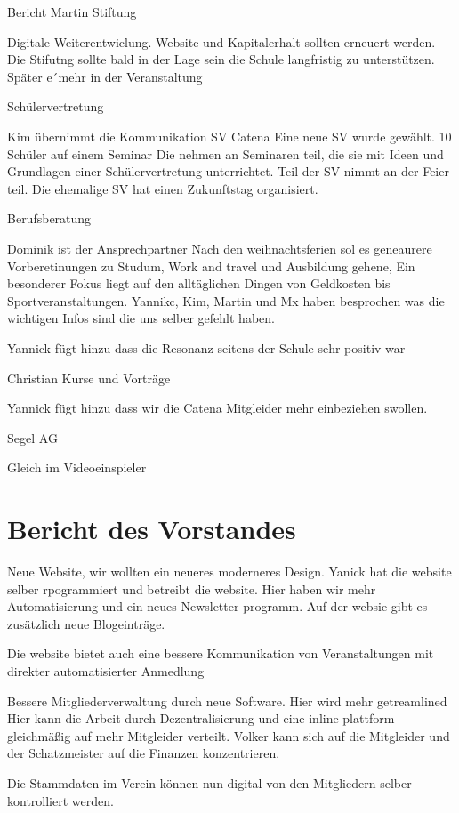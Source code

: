 \documentclass[a4paper, 11pt]{article}
\begin{document}
Bericht Martin Stiftung

Digitale Weiterentwiclung. Website und Kapitalerhalt sollten erneuert werden.
Die Stifutng sollte bald in der Lage sein die Schule langfristig zu unterstützen. 
Später e´mehr in der Veranstaltung

Schülervertretung

Kim übernimmt die Kommunikation SV Catena
Eine neue SV wurde gewählt. 10 Schüler auf einem Seminar
Die nehmen an Seminaren teil, die sie mit Ideen und Grundlagen einer Schülervertretung unterrichtet.
Teil der SV nimmt an der Feier teil.
Die ehemalige SV hat einen Zukunftstag organisiert.

Berufsberatung

Dominik ist der Ansprechpartner
Nach den weihnachtsferien sol es geneaurere Vorberetinungen zu Studum, Work and travel und Ausbildung gehene,
Ein besonderer Fokus liegt auf den alltäglichen Dingen von Geldkosten bis Sportveranstaltungen.
Yannikc, Kim, Martin und Mx haben besprochen was die wichtigen Infos sind die uns selber gefehlt haben.

Yannick fügt hinzu dass die Resonanz seitens der Schule sehr positiv war

Christian Kurse und Vorträge

Yannick fügt hinzu dass wir die Catena Mitgleider mehr einbeziehen swollen.

Segel AG

Gleich im Videoeinspieler


\section*{Bericht des Vorstandes}

Neue Website, wir wollten ein neueres moderneres Design.
Yanick hat die website selber rpogrammiert und betreibt die website.
Hier haben wir mehr Automatisierung und ein neues Newsletter programm.
Auf der websie gibt es zusätzlich neue Blogeinträge.

Die website bietet auch eine bessere Kommunikation von Veranstaltungen mit direkter automatisierter Anmedlung

Bessere Mitgliederverwaltung durch neue Software. Hier wird mehr getreamlined
Hier kann die Arbeit durch Dezentralisierung und eine inline plattform gleichmäßig auf mehr Mitgleider verteilt.
Volker kann sich auf die Mitgleider und der Schatzmeister auf die Finanzen konzentrieren.

Die Stammdaten im Verein können nun digital von den Mitgliedern selber kontrolliert werden.
\end{document}
